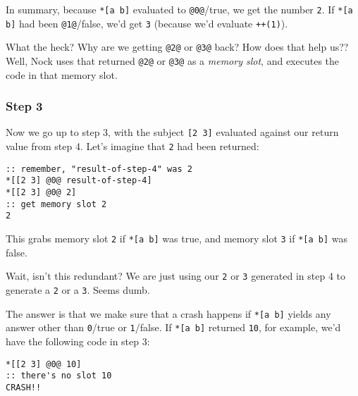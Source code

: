 \documentclass[twoside]{article}
\begin{document}
In summary, because \lstinline[style=inlinecode]{*[a b]} evaluated to \lstinline[style=inlinecode]{@0@}/true, we get the number \lstinline[style=inlinecode]{2}. If \lstinline[style=inlinecode]{*[a b]} had been \lstinline[style=inlinecode]{@1@}/false, we'd get \lstinline[style=inlinecode]{3} (because we'd evaluate \lstinline[style=inlinecode]{++(1)}).

What the heck? Why are we getting \lstinline[style=inlinecode]{@2@} or \lstinline[style=inlinecode]{@3@} back? How does that help us?? Well, Nock uses that returned \lstinline[style=inlinecode]{@2@} or \lstinline[style=inlinecode]{@3@} as a \emph{memory slot}, and executes the code in that memory slot.

\subsubsection{Step 3}

Now we go up to step 3, with the subject \lstinline[style=inlinecode]{[2 3]} evaluated against our return value from step 4.  Let's imagine that \lstinline[style=inlinecode]{2} had been returned:

\begin{lstlisting}[style=listingblock]
:: remember, "result-of-step-4" was 2
*[[2 3] @0@ result-of-step-4]
*[[2 3] @0@ 2]
:: get memory slot 2
2
\end{lstlisting}

This grabs memory slot \lstinline[style=inlinecode]{2} if \lstinline[style=inlinecode]{*[a b]} was true, and memory slot \lstinline[style=inlinecode]{3} if \lstinline[style=inlinecode]{*[a b]} was false.

Wait, isn't this redundant? We are just using our \lstinline[style=inlinecode]{2} or \lstinline[style=inlinecode]{3} generated in step 4 to generate a \lstinline[style=inlinecode]{2} or a \lstinline[style=inlinecode]{3}. Seems dumb.

The answer is that we make sure that a crash happens if \lstinline[style=inlinecode]{*[a b]} yields any answer other than \lstinline[style=inlinecode]{0}/true or \lstinline[style=inlinecode]{1}/false.  If \lstinline[style=inlinecode]{*[a b]} returned \lstinline[style=inlinecode]{10}, for example, we'd have the following code in step 3:

\begin{lstlisting}[style=listingblock]
*[[2 3] @0@ 10]
:: there's no slot 10
CRASH!!
\end{lstlisting}
\end{document}
